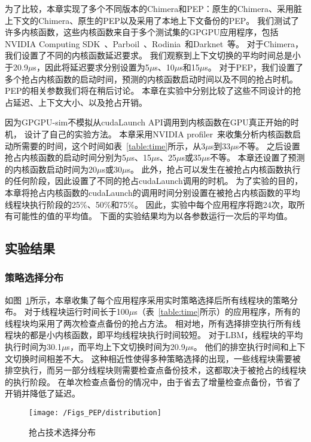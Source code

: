 为了比较，本章实现了多个不同版本的Chimera和PEP：原生的Chimera、采用脏上下文的Chimera、原生的PEP以及采用了本地上下文备份的PEP。
我们测试了许多内核函数，这些内核函数来自于多个测试集的GPGPU应用程序，包括NVIDIA Computing SDK~、Parboil~、Rodinia~和Darknet~等。
对于Chimera，我们设置了不同的内核函数延迟要求。
我们观察到上下文切换的平均时间总是小于20.9$\mu$s，因此将延迟要求分别设置为5$\mu$s、10$\mu$s和15$\mu$s。
对于PEP，我们设置了多个抢占内核函数的启动时间，预测的内核函数启动时间以及不同的抢占时机。
PEP的相关参数我们将在稍后讨论。
本章在实验中分别比较了这些不同设计的抢占延迟、上下文大小、以及抢占开销。

因为GPGPU-sim不模拟从cudaLaunch API调用到内核函数在GPU真正开始的时机，
设计了自己的实验方法。
本章采用NVIDIA profiler~来收集分析内核函数启动所需要的时间，这个时间如表~\ref{table:time}所示，从3$\mu$s到33$\mu$s不等。
之后设置抢占内核函数的启动时间分别为5$\mu$s、15$\mu$s、25$\mu$s或35$\mu$s不等。
本章还设置了预测的内核函数启动时间为20$\mu$s或30$\mu$s。
此外，抢占可以发生在被抢占内核函数执行的任何阶段，因此设置了不同的抢占cudaLaunch调用的时机。
为了实验的目的，本章将抢占内核函数的cudaLaunch的调用时间分别设置在被抢占内核函数的平均线程块执行阶段的25\%、50\%和75\%。
因此，实验中每个应用程序将跑24次，取所有可能性的值的平均值。
下面的实验结果均为以各参数运行一次后的平均值。


\subsection{实验结果}

\subsubsection{策略选择分布}
如图~\ref{fig:distribution}所示，本章收集了每个应用程序采用实时策略选择后所有线程块的策略分布。
对于线程块运行时间长于100$\mu$s（表~\ref{table:time}所示）的应用程序，所有的线程块均采用了两次检查点备份的抢占方法。
相对地，所有选择排空执行所有线程块的都是小内核函数，即平均线程块执行时间较短。
对于LBM，线程块的平均执行时间为30.1$\mu$s，而平均上下文切换时间为20.9$\mu$s。
他们的排空执行时间和上下文切换时间相差不大。
这种相近性使得多种策略选择的出现，一些线程块需要被排空执行，而另一部分线程块则需要检查点备份技术，这都取决于被抢占的线程块的执行阶段。
在单次检查点备份的情况中，由于省去了增量检查点备份，节省了开销并降低了延迟。

\begin{figure}[htbp] %
  \centering
  \texttt{[image: /Figs\_PEP/distribution]}
  \caption{抢占技术选择分布}
  \label{fig:distribution}
\end{figure}



